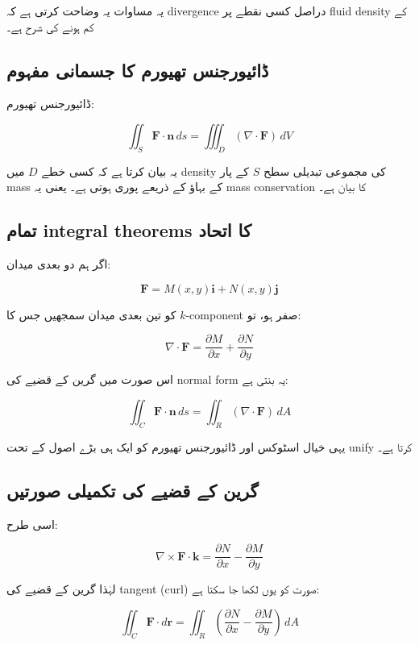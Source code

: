 \begin{enumerate}
یہ مساوات یہ وضاحت کرتی ہے کہ divergence دراصل کسی نقطے پر fluid density کے کم ہونے کی شرح ہے۔

\bigskip

\subsection*{ڈائیورجنس تھیورم کا جسمانی مفہوم}

ڈائیورجنس تھیورم:

\[
\iint_S \mathbf{F}\cdot \mathbf{n}\, ds
=
\iiint_D (\nabla \cdot \mathbf{F})\, dV
\]

یہ بیان کرتا ہے کہ کسی خطے \( D \) میں density کی مجموعی تبدیلی سطح \( S \) کے پار mass کے بہاؤ کے ذریعے پوری ہوتی ہے۔ یعنی یہ mass conservation کا بیان ہے۔

\bigskip

\subsection*{تمام integral theorems کا اتحاد}

اگر ہم دو بعدی میدان:

\[
\mathbf{F} = M(x,y)\mathbf{i} + N(x,y)\mathbf{j}
\]

کو تین بعدی میدان سمجھیں جس کا \( k \)-component صفر ہو، تو:

\[
\nabla \cdot \mathbf{F}
=
\frac{\partial M}{\partial x}
+
\frac{\partial N}{\partial y}
\]

اس صورت میں گرین کے قضیے کی normal form یہ بنتی ہے:

\[
\iint_C \mathbf{F}\cdot \mathbf{n}\, ds
=
\iint_R (\nabla \cdot \mathbf{F})\, dA
\]

یہی خیال اسٹوکس اور ڈائیورجنس تھیورم کو ایک ہی بڑے اصول کے تحت unify کرتا ہے۔



\subsection*{گرین کے قضیے کی تکمیلی صورتیں}

اسی طرح:

\[
\nabla \times \mathbf{F} \cdot \mathbf{k}
=
\frac{\partial N}{\partial x}
-
\frac{\partial M}{\partial y}
\]

لہٰذا گرین کے قضیے کی tangent (curl) صورت کو یوں لکھا جا سکتا ہے:

\[
\iint_C \mathbf{F}\cdot d\mathbf{r}
=
\iint_R \left(
\frac{\partial N}{\partial x}
-
\frac{\partial M}{\partial y}
\right)\, dA
\]


\end{enumerate}
